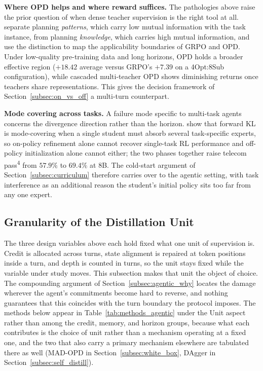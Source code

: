 \documentclass{article} %
\begin{document}
\textbf{Where OPD helps and where reward suffices.} The pathologies above raise the prior question of when dense teacher supervision is the right tool at all. \citet{2607.24720} separate planning \emph{patterns}, which carry low mutual information with the task instance, from planning \emph{knowledge}, which carries high mutual information, and use the distinction to map the applicability boundaries of GRPO and OPD. Under low-quality pre-training data and long horizons, OPD holds a broader effective region ($+18.42$ average versus GRPO's $+7.39$ on a 4Opt:8Sub configuration), while cascaded multi-teacher OPD shows diminishing returns once teachers share representations. This gives the decision framework of Section~\ref{subsec:on_vs_off} a multi-turn counterpart.

\textbf{Mode covering across tasks.} A failure mode specific to multi-task agents concerns the divergence direction rather than the horizon. \citet{2606.30044} show that forward KL is mode-covering when a single student must absorb several task-specific experts, so on-policy refinement alone cannot recover single-task RL performance and off-policy initialization alone cannot either; the two phases together raise telecom pass\textsuperscript{4} from $57.9\%$ to $69.4\%$ at 8B. The cold-start argument of Section~\ref{subsec:curriculum} therefore carries over to the agentic setting, with task interference as an additional reason the student's initial policy sits too far from any one expert.

\subsection{Granularity of the Distillation Unit}
\label{subsec:agentic_granularity}

The three design variables above each hold fixed what one unit of supervision is. Credit is allocated across turns, state alignment is repaired at token positions inside a turn, and depth is counted in turns, so the unit stays fixed while the variable under study moves. This subsection makes that unit the object of choice. The compounding argument of Section~\ref{subsec:agentic_why} locates the damage wherever the agent's commitments become hard to reverse, and nothing guarantees that this coincides with the turn boundary the protocol imposes. The methods below appear in Table~\ref{tab:methods_agentic} under the Unit aspect rather than among the credit, memory, and horizon groups, because what each contributes is the choice of unit rather than a mechanism operating at a fixed one, and the two that also carry a primary mechanism elsewhere are tabulated there as well (MAD-OPD in Section~\ref{subsec:white_box}, DAgger in Section~\ref{subsec:self_distill}).
\end{document}
